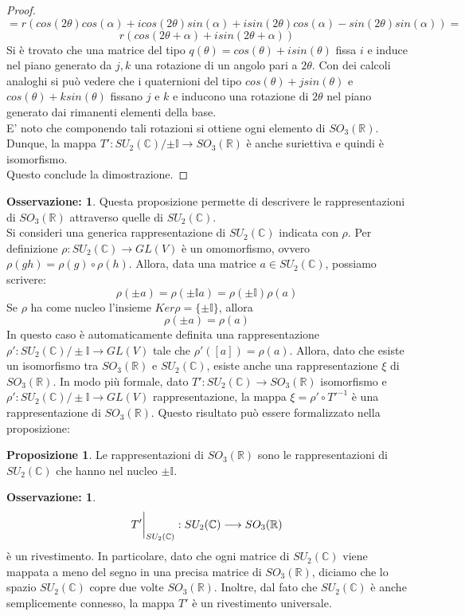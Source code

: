 \documentclass[12pt,a4paper]{report}
\theoremstyle{definition}
\theoremstyle{Theorem}
\newtheorem{Prop}[Def]{Proposizione}
\theoremstyle{definition}
\theoremstyle{definition}
\theoremstyle{definition}
\newtheorem{Obs}[Def]{Osservazione:}
\begin{document}
\begin{proof}
$$=r(cos(2\theta)cos(\alpha)+icos(2\theta)sin(\alpha)+isin(2\theta)cos(\alpha)-sin(2\theta)sin(\alpha))=$$
$$r(cos(2\theta+\alpha)+isin(2\theta+\alpha))$$
Si è trovato che una matrice del tipo $q(\theta)=cos(\theta)+isin(\theta)$ fissa $i$ e induce nel piano generato da $j,k$ una rotazione di un angolo pari a $2\theta$. Con dei calcoli analoghi si può vedere che i quaternioni del tipo $cos(\theta)+jsin(\theta)$ e $cos(\theta)+ksin(\theta)$ fissano $j$ e $k$ e inducono una rotazione di $2\theta$ nel piano generato dai rimanenti elementi della base.\\
E' noto che componendo tali rotazioni si ottiene ogni elemento di $SO_3(\mathbb{R})$. Dunque, la mappa $T':SU_2(\mathbb{C})/{\pm \mathbb{I}}\longrightarrow SO_3(\mathbb{R})$ è anche suriettiva e quindi è isomorfismo.\\
Questo conclude la dimostrazione.
\end{proof}
\begin{Obs}
	Questa proposizione permette di descrivere le rappresentazioni di $SO_3(\mathbb{R})$ attraverso quelle di $SU_2(\mathbb{C})$. \\
	Si consideri una generica rappresentazione di $SU_2(\mathbb{C})$ indicata con $\rho$. Per definizione $\rho:SU_2(\mathbb{C})\rightarrow GL(V)$ è un omomorfismo, ovvero $\rho(gh)=\rho(g)\circ\rho(h)$. Allora, data una matrice $a\in SU_2(\mathbb{C})$, possiamo scrivere:
	$$\rho(\pm a)=\rho(\pm \mathbb{I}a)=\rho(\pm\mathbb{I})\rho(a)$$
	Se $\rho$ ha come nucleo l'insieme $Ker\rho=\{\pm\mathbb{I}\}$, allora
	$$\rho(\pm a)=\rho(a)$$
	In questo caso è automaticamente definita una rappresentazione $\rho':SU_2(\mathbb{C})/\pm\mathbb{I}\longrightarrow GL(V)$ tale che $\rho'([a])=\rho(a)$.
	Allora, dato che esiste un isomorfismo tra $SO_3(\mathbb{R})$ e $SU_2(\mathbb{C})$, esiste anche una rappresentazione $\xi$ di $SO_3(\mathbb{R})$. In modo più formale, dato $T':SU_2(\mathbb{C})\rightarrow SO_3(\mathbb{R})$ isomorfismo e $\rho':SU_2(\mathbb{C})/\pm\mathbb{I}\longrightarrow GL(V)$ rappresentazione, la mappa $\xi=\rho'\circ T'^{-1}$ è una rappresentazione di $SO_3(\mathbb{R})$.
	Questo risultato può essere formalizzato nella proposizione:
\end{Obs}
\begin{Prop}
	Le rappresentazioni di $SO_3(\mathbb{R})$ sono le rappresentazioni di $SU_2(\mathbb{C})$ che hanno nel nucleo $\pm\mathbb{I}$. 
\end{Prop}
\begin{Obs}
	 $$T'\bigg{\rvert}_{SU_2(\mathbb{C})}:SU_2(\mathbb{C})\longrightarrow SO_3(\mathbb{R})$$
	 è un rivestimento. In particolare, dato che ogni matrice di $SU_2(\mathbb{C})$ viene mappata a meno del segno in una precisa matrice di $SO_3(\mathbb{R})$, diciamo che lo spazio $SU_2(\mathbb{C})$ copre due volte $SO_3(\mathbb{R})$. Inoltre, dal fato che $SU_2(\mathbb{C})$ è anche semplicemente connesso, la mappa $T'$ è un rivestimento universale.
\end{Obs}
\end{document}
